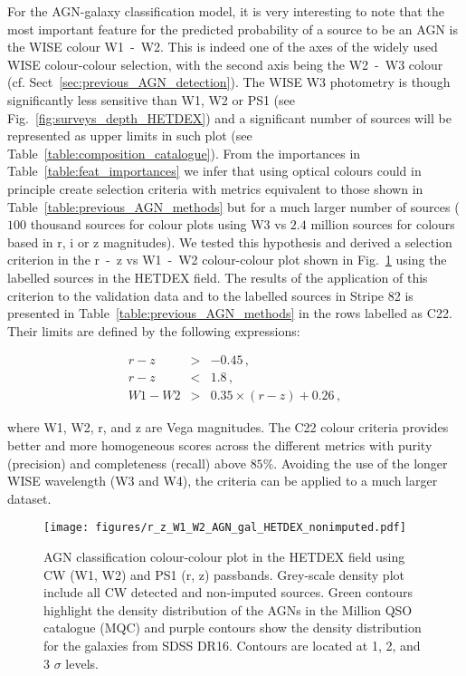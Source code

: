 \documentclass{aa}
\begin{document}
For the AGN-galaxy classification model, it is very interesting to note that the most important feature for the predicted probability of a source to be an AGN is the WISE colour W1~-~W2. This is indeed one of the axes of the widely used WISE colour-colour selection, with the second axis being the W2~-~W3 colour (cf. Sect~\ref{sec:previous_AGN_detection}). The WISE W3 photometry is though significantly less sensitive than W1, W2 or PS1 (see Fig.~\ref{fig:surveys_depth_HETDEX}) and a significant number of sources will be represented as upper limits in such plot (see Table~\ref{table:composition_catalogue}). From the importances in Table~\ref{table:feat_importances} we infer that using optical colours could in principle create selection criteria with metrics equivalent to those shown in Table~\ref{table:previous_AGN_methods} but for a much larger number of sources ($100$ thousand sources for colour plots using W3 vs $2.4$ million sources for colours based in r, i or z magnitudes). We tested this hypothesis and derived a selection criterion in the r~-~z vs W1~-~W2 colour-colour plot shown in Fig.~\ref{fig:HETDEX_rz_W1W2_AGN_gal_class} using the labelled sources in the HETDEX field. The results of the application of this criterion to the validation data and to the labelled sources in Stripe 82 is presented in Table~\ref{table:previous_AGN_methods} in the rows labelled as C22. Their limits are defined by the following expressions:

\begin{eqnarray}
r - z &>& -0.45\,,\\
r - z &<& 1.8\,,\\
W1 - W2 &>& 0.35 \times (r - z) + 0.26\,,
\end{eqnarray}

\noindent where W1, W2, r, and z are Vega magnitudes. The C22 colour criteria provides better and more homogeneous scores across the different metrics with purity (precision) and completeness (recall) above $85\%$. Avoiding the use of the longer WISE wavelength (W3 and W4), the criteria can be applied to a much larger dataset.


\begin{figure}
    \centering
    \begin{minipage}{0.85\columnwidth}
    \texttt{[image: figures/r\_z\_W1\_W2\_AGN\_gal\_HETDEX\_nonimputed.pdf]}
    \end{minipage}%
    \caption{AGN classification colour-colour plot in the HETDEX field using CW (W1, W2) and PS1 (r, z) passbands. Grey-scale density plot include all CW detected and non-imputed sources. Green contours highlight the density distribution of the AGNs in the Million QSO catalogue (MQC) and purple contours show the density distribution for the galaxies from SDSS DR16. Contours are located at 1, 2, and 3 $\sigma$ levels.}
   \label{fig:HETDEX_rz_W1W2_AGN_gal_class}
\end{figure}
\end{document}
